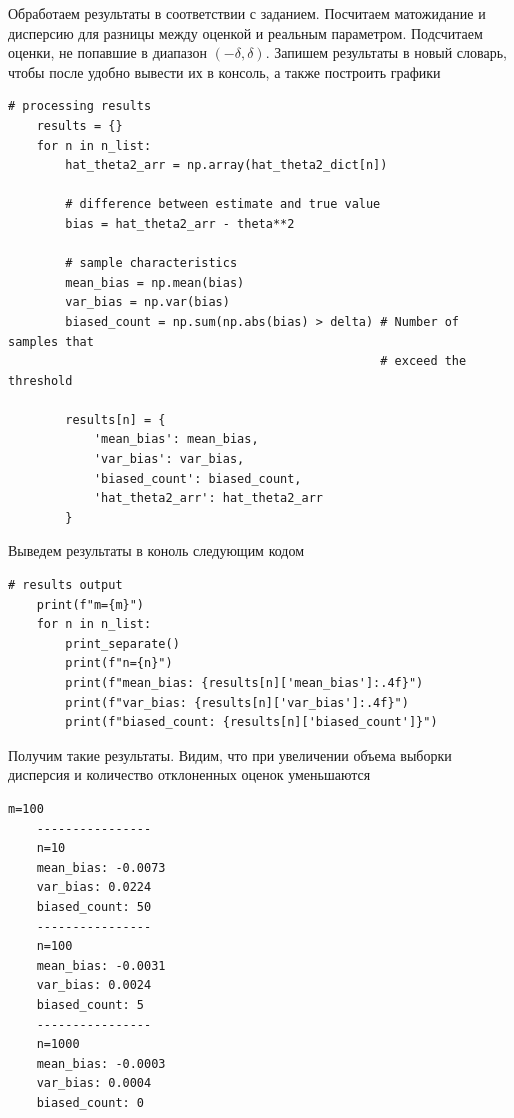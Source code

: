 \documentclass[a4paper, 12pt]{article}
\begin{document}
    Обработаем результаты в соответствии с заданием. Посчитаем матожидание и дисперсию для разницы
    между оценкой и реальным параметром. Подсчитаем оценки, не попавшие в диапазон $\left(-\delta,\delta\right)$.
    Запишем результаты в новый словарь, чтобы после удобно вывести их в консоль, а также построить графики
    \begin{lstlisting}[label=proc_res, caption={Подсчет выборочных характеристик смещения и количество отличиий оценки от реального параметра на порог}]
    # processing results
    results = {}
    for n in n_list:
        hat_theta2_arr = np.array(hat_theta2_dict[n])
            
        # difference between estimate and true value
        bias = hat_theta2_arr - theta**2
            
        # sample characteristics
        mean_bias = np.mean(bias)
        var_bias = np.var(bias)
        biased_count = np.sum(np.abs(bias) > delta) # Number of samples that
                                                    # exceed the threshold
            
        results[n] = {
            'mean_bias': mean_bias,
            'var_bias': var_bias,
            'biased_count': biased_count,
            'hat_theta2_arr': hat_theta2_arr
        }
    \end{lstlisting}


    Выведем результаты в коноль следующим кодом
    \begin{lstlisting}[label=res2, caption={Код для вывода в консоль результатов эксперимента}]
    # results output
    print(f"m={m}")
    for n in n_list:
        print_separate()
        print(f"n={n}")
        print(f"mean_bias: {results[n]['mean_bias']:.4f}")
        print(f"var_bias: {results[n]['var_bias']:.4f}")
        print(f"biased_count: {results[n]['biased_count']}")
    \end{lstlisting}


    Получим такие результаты. Видим, что при увеличении объема выборки дисперсия и количество отклоненных оценок уменьшаются
    \begin{lstlisting}[label=res2out, caption={Вывод результатов эксперимента в консоль}]
    m=100
    ----------------  
    n=10
    mean_bias: -0.0073
    var_bias: 0.0224  
    biased_count: 50  
    ----------------  
    n=100
    mean_bias: -0.0031
    var_bias: 0.0024
    biased_count: 5
    ----------------
    n=1000
    mean_bias: -0.0003
    var_bias: 0.0004
    biased_count: 0
    \end{lstlisting}
\end{document}
